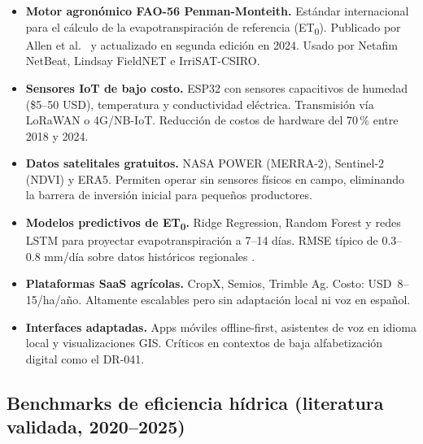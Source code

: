 \documentclass[12pt,letterpaper]{article}
\begin{document}
\begin{itemize}
  \item \textbf{Motor agronómico FAO-56 Penman-Monteith.} Estándar internacional para el
    cálculo de la evapotranspiración de referencia (ET\textsubscript{0}). Publicado por
    Allen et al.\ \cite{allen1998} y actualizado en segunda edición en 2024. Usado por
    Netafim NetBeat, Lindsay FieldNET e IrriSAT-CSIRO.

  \item \textbf{Sensores IoT de bajo costo.} ESP32 con sensores capacitivos de humedad
    (\$5–50 USD), temperatura y conductividad eléctrica. Transmisión vía LoRaWAN o
    4G/NB-IoT. Reducción de costos de hardware del 70\,\% entre 2018 y 2024.

  \item \textbf{Datos satelitales gratuitos.} NASA POWER (MERRA-2), Sentinel-2 (NDVI) y
    ERA5. Permiten operar sin sensores físicos en campo, eliminando la barrera de inversión
    inicial para pequeños productores.

  \item \textbf{Modelos predictivos de ET\textsubscript{0}.} Ridge Regression, Random Forest
    y redes LSTM para proyectar evapotranspiración a 7–14 días. RMSE típico de 0.3–0.8
    mm/día sobre datos históricos regionales \cite{scidirect2025}.

  \item \textbf{Plataformas SaaS agrícolas.} CropX, Semios, Trimble Ag. Costo:
    USD~8–15/ha/año. Altamente escalables pero sin adaptación local ni voz en español.

  \item \textbf{Interfaces adaptadas.} Apps móviles offline-first, asistentes de voz en
    idioma local y visualizaciones GIS. Críticos en contextos de baja alfabetización
    digital como el DR-041.
\end{itemize}

\subsection{Benchmarks de eficiencia hídrica (literatura validada, 2020–2025)}
\end{document}
